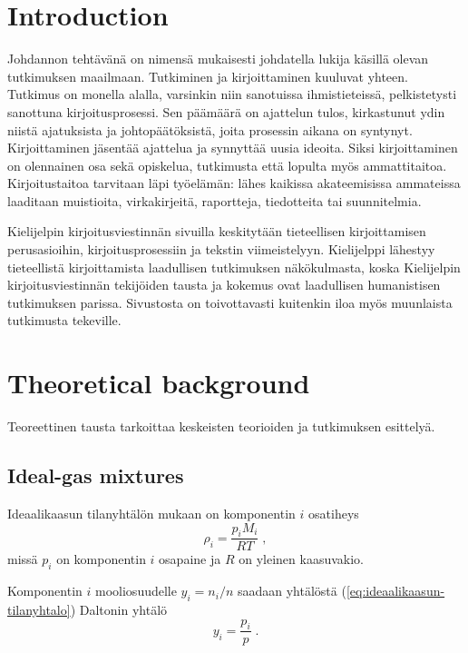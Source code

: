 \documentclass[final]{thesis} %
\begin{document}
\section{Introduction}
\label{sec:introduction}

Johdannon tehtävänä on nimensä mukaisesti johdatella lukija käsillä olevan tutkimuksen maailmaan. Tutkiminen ja kirjoittaminen kuuluvat yhteen. Tutkimus on monella alalla, varsinkin niin sanotuissa ihmistieteissä, pelkistetysti sanottuna kirjoitusprosessi. Sen päämäärä on ajattelun tulos, kirkastunut ydin niistä ajatuksista ja johtopäätöksistä, joita prosessin aikana on syntynyt. Kirjoittaminen jäsentää ajattelua ja synnyttää uusia ideoita. Siksi kirjoittaminen on olennainen osa sekä opiskelua, tutkimusta että lopulta myös ammattitaitoa. Kirjoitustaitoa tarvitaan läpi työelämän: lähes kaikissa akateemisissa ammateissa laaditaan muistioita, virkakirjeitä, raportteja, tiedotteita tai suunnitelmia.

Kielijelpin kirjoitusviestinnän sivuilla keskitytään tieteellisen kirjoittamisen perusasioihin, kirjoitusprosessiin ja tekstin viimeistelyyn. Kielijelppi lähestyy tieteellistä kirjoittamista laadullisen tutkimuksen näkökulmasta, koska Kielijelpin kirjoitusviestinnän tekijöiden tausta ja kokemus ovat laadullisen humanistisen tutkimuksen parissa. Sivustosta on toivottavasti kuitenkin iloa myös muunlaista tutkimusta tekeville.

\lipsum[1]

\section{Theoretical background}
\label{sec:theory-background}

Teoreettinen tausta tarkoittaa keskeisten teorioiden ja tutkimuksen esittelyä. \lipsum[1]

\subsection{Ideal-gas mixtures}
\label{sec:ideal-gas-mixtures}

Ideaalikaasun tilanyhtälön mukaan on komponentin $i$ osatiheys
%
\begin{equation}
   \label{eq:ideaalikaasun-tilanyhtalo}
   \rho_i = \frac{p_i M_i}{R T}\;,
\end{equation}
%
missä $p_i$ on komponentin $i$ osapaine ja $R$ on yleinen kaasuvakio. 

Komponentin $i$ mooliosuudelle $y_i = n_i/n$ saadaan yhtälöstä (\ref{eq:ideaalikaasun-tilanyhtalo}) Daltonin yhtälö
%
\begin{equation}
   \label{eq:daltonin-yhtalo}
   y_i = \frac{p_i}{p}\;.
\end{equation}
\end{document}
